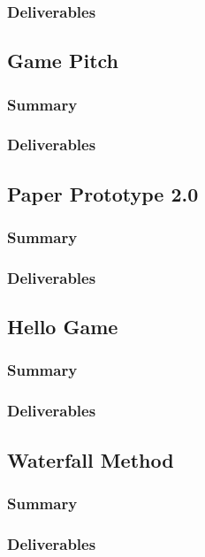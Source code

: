 \documentclass{article}
\begin{document}
\subsubsection{Deliverables}

\subsection{Game Pitch}
\subsubsection{Summary}
\subsubsection{Deliverables}

\subsection{Paper Prototype 2.0}
\subsubsection{Summary}
\subsubsection{Deliverables}

\subsection{Hello Game}
\subsubsection{Summary}
\subsubsection{Deliverables}

\subsection{Waterfall Method}
\subsubsection{Summary}
\subsubsection{Deliverables}
\end{document}
